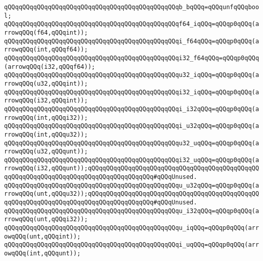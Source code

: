 \newline
\verb|qQQqqQQqqQQqqQQqqQQqqQQqqQQqqQQqqQQqqQQqqQQqqQQqb_bqQQq=qQQqunfqQQqbool;|\newline
\newline
\verb|qQQqqQQqqQQqqQQqqQQqqQQqqQQqqQQqqQQqqQQqqQQqqQQqf64_iqQQq=qQQqp0qQQq(arrowqQQq(f64,qQQqint));|\newline
\verb|qQQqqQQqqQQqqQQqqQQqqQQqqQQqqQQqqQQqqQQqqQQqqQQqi_f64qQQq=qQQqp0qQQq(arrowqQQq(int,qQQqf64));|\newline
\verb|qQQqqQQqqQQqqQQqqQQqqQQqqQQqqQQqqQQqqQQqqQQqqQQqi32_f64qQQq=qQQqp0qQQq(arrowqQQq(i32,qQQqf64));|\newline
\newline
\verb|qQQqqQQqqQQqqQQqqQQqqQQqqQQqqQQqqQQqqQQqqQQqqQQqu32_iqQQq=qQQqp0qQQq(arrowqQQq(u32,qQQqint));|\newline
\verb|qQQqqQQqqQQqqQQqqQQqqQQqqQQqqQQqqQQqqQQqqQQqqQQqi32_iqQQq=qQQqp0qQQq(arrowqQQq(i32,qQQqint));|\newline
\newline
\verb|qQQqqQQqqQQqqQQqqQQqqQQqqQQqqQQqqQQqqQQqqQQqqQQqi_i32qQQq=qQQqp0qQQq(arrowqQQq(int,qQQqi32));|\newline
\verb|qQQqqQQqqQQqqQQqqQQqqQQqqQQqqQQqqQQqqQQqqQQqqQQqi_u32qQQq=qQQqp0qQQq(arrowqQQq(int,qQQqu32));|\newline
\newline
\verb|qQQqqQQqqQQqqQQqqQQqqQQqqQQqqQQqqQQqqQQqqQQqqQQqu32_uqQQq=qQQqp0qQQq(arrowqQQq(u32,qQQqunt));|\newline
\verb|qQQqqQQqqQQqqQQqqQQqqQQqqQQqqQQqqQQqqQQqqQQqqQQqi32_uqQQq=qQQqp0qQQq(arrowqQQq(i32,qQQqunt));qQQqqQQqqQQqqQQqqQQqqQQqqQQqqQQqqQQqqQQqqQQqqQQqqQQqqQQqqQQqqQQqqQQqqQQqqQQqqQQqqQQqqQQq#qQQqUnused.|\newline
\newline
\verb|qQQqqQQqqQQqqQQqqQQqqQQqqQQqqQQqqQQqqQQqqQQqqQQqu_u32qQQq=qQQqp0qQQq(arrowqQQq(unt,qQQqu32));qQQqqQQqqQQqqQQqqQQqqQQqqQQqqQQqqQQqqQQqqQQqqQQqqQQqqQQqqQQqqQQqqQQqqQQqqQQqqQQqqQQqqQQq#qQQqUnused.|\newline
\verb|qQQqqQQqqQQqqQQqqQQqqQQqqQQqqQQqqQQqqQQqqQQqqQQqu_i32qQQq=qQQqp0qQQq(arrowqQQq(unt,qQQqi32));|\newline
\newline
\verb|qQQqqQQqqQQqqQQqqQQqqQQqqQQqqQQqqQQqqQQqqQQqqQQqu_iqQQq=qQQqp0qQQq(arrowqQQq(unt,qQQqint));|\newline
\verb|qQQqqQQqqQQqqQQqqQQqqQQqqQQqqQQqqQQqqQQqqQQqqQQqi_uqQQq=qQQqp0qQQq(arrowqQQq(int,qQQqunt));|\newline

